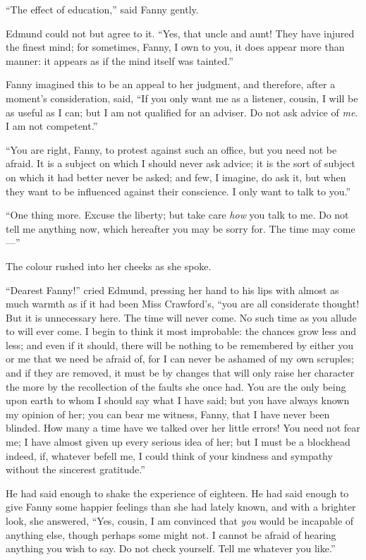 ``The effect of education,'' said Fanny gently.

Edmund could not but agree to it.  ``Yes, that uncle and aunt!
They have injured the finest mind; for sometimes,
Fanny, I own to you, it does appear more than manner:
it appears as if the mind itself was tainted.''

Fanny imagined this to be an appeal to her judgment,
and therefore, after a moment's consideration, said, ``If you
only want me as a listener, cousin, I will be as useful
as I can; but I am not qualified for an adviser.
Do not ask advice of \emph{me}.  I am not competent.''

``You are right, Fanny, to protest against such an office,
but you need not be afraid.  It is a subject on which I
should never ask advice; it is the sort of subject on
which it had better never be asked; and few, I imagine,
do ask it, but when they want to be influenced against
their conscience.  I only want to talk to you.''

``One thing more.  Excuse the liberty; but take care
\emph{how} you talk to me.  Do not tell me anything now,
which hereafter you may be sorry for.  The time may come---''

The colour rushed into her cheeks as she spoke.

``Dearest Fanny!'' cried Edmund, pressing her hand to
his lips with almost as much warmth as if it had been
Miss Crawford's, ``you are all considerate thought!
But it is unnecessary here.  The time will never come.
No such time as you allude to will ever come.  I begin to
think it most improbable:  the chances grow less and less;
and even if it should, there will be nothing to be
remembered by either you or me that we need be afraid of,
for I can never be ashamed of my own scruples; and if they
are removed, it must be by changes that will only raise
her character the more by the recollection of the faults
she once had.  You are the only being upon earth to whom
I should say what I have said; but you have always known
my opinion of her; you can bear me witness, Fanny, that I
have never been blinded.  How many a time have we
talked over her little errors!  You need not fear me;
I have almost given up every serious idea of her;
but I must be a blockhead indeed, if, whatever befell me,
I could think of your kindness and sympathy without the
sincerest gratitude.''

He had said enough to shake the experience of eighteen.
He had said enough to give Fanny some happier feelings
than she had lately known, and with a brighter look,
she answered, ``Yes, cousin, I am convinced that \emph{you}
would be incapable of anything else, though perhaps some
might not.  I cannot be afraid of hearing anything you
wish to say.  Do not check yourself.  Tell me whatever
you like.''

